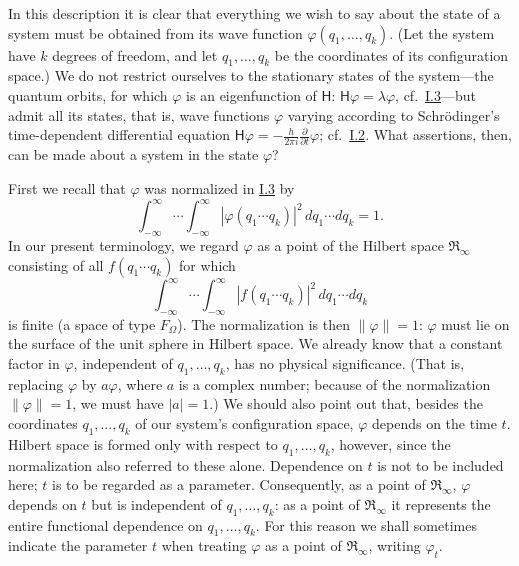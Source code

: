 \documentclass[fontsize=13pt,twoside,openany,headings=normal,parskip=false,bookmarkpackage=false,DIV=calc]{scrbook}
\begin{document}
\hypertarget{origpage-102}{}%
In this description it is clear that everything we wish to say about the state of a system must be obtained from its wave function $\varphi(q_1,\ldots,q_k)$. (Let the system have $k$ degrees of freedom, and let $q_1,\ldots,q_k$ be the coordinates of its configuration space.) We do not restrict ourselves to the stationary states of the system---the quantum orbits, for which $\varphi$ is an eigenfunction of $\mathsf H$: $\mathsf H\varphi=\lambda\varphi$, cf.\ \hyperref[sec:I.3]{I.3}---but admit all its states, that is, wave functions $\varphi$ varying according to Schrödinger's time-dependent differential equation $\mathsf H\varphi=-\frac h{2\pi i}\frac\partial{\partial t}\varphi$; cf.\ \hyperref[sec:I.2]{I.2}. What assertions, then, can be made about a system in the state $\varphi$?

First we recall that $\varphi$ was normalized in \hyperref[sec:I.3]{I.3} by
\[
\int_{-\infty}^{\infty}\cdots\int_{-\infty}^{\infty}
|\varphi(q_1\cdots q_k)|^2\,dq_1\cdots dq_k=1.
\]
In our present terminology, we regard $\varphi$ as a point of the Hilbert space $\mathfrak R_\infty$ consisting of all $f(q_1\cdots q_k)$ for which
\[
\int_{-\infty}^{\infty}\cdots\int_{-\infty}^{\infty}
|f(q_1\cdots q_k)|^2\,dq_1\cdots dq_k
\]
is finite (a space of type $F_\Omega$). The normalization is then $\|\varphi\|=1$: $\varphi$ must lie on the surface of the unit sphere in Hilbert space. We already know that a constant factor in $\varphi$, independent of $q_1,\ldots,q_k$, has no physical significance. (That is, replacing $\varphi$ by $a\varphi$, where $a$ is a complex number; because of the normalization $\|\varphi\|=1$, we must have $|a|=1$.) We should also point out that, besides the coordinates $q_1,\ldots,q_k$ of our system's configuration space, $\varphi$ depends on the time $t$. Hilbert space is formed only with respect to $q_1,\ldots,q_k$, however, since the normalization also referred to these alone. Dependence on $t$ is not to be included here; $t$ is to be regarded as a parameter. Consequently, as a point of $\mathfrak R_\infty$, $\varphi$ depends on $t$ but is independent of $q_1,\ldots,q_k$: as a point of $\mathfrak R_\infty$ it represents the entire functional dependence on $q_1,\ldots,q_k$. For this reason we shall sometimes indicate the parameter $t$ when treating $\varphi$ as a point of $\mathfrak R_\infty$, writing $\varphi_t$.
\end{document}
